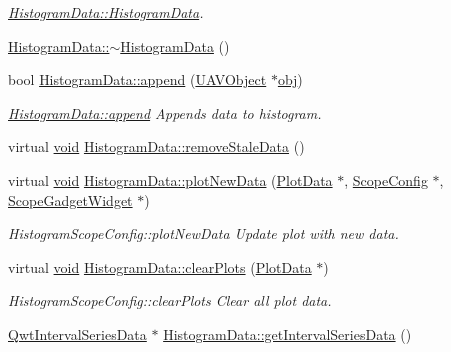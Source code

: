 \begin{DoxyCompactItemize}
\begin{DoxyCompactList}\small\item\em \hyperlink{group___scope_plugin_ga72e50dd5614c61d39ec10aa120c47d3b}{Histogram\-Data\-::\-Histogram\-Data}. \end{DoxyCompactList}\item 
\hyperlink{group___scope_plugin_ga4469655db4ea251dc664d6537ac56c5a}{Histogram\-Data\-::$\sim$\-Histogram\-Data} ()
\item 
bool \hyperlink{group___scope_plugin_ga0d810ba48c487ee265cdc1386b23bece}{Histogram\-Data\-::append} (\hyperlink{class_u_a_v_object}{U\-A\-V\-Object} $\ast$\hyperlink{glext_8h_a0c0d4701a6c89f4f7f0640715d27ab26}{obj})
\begin{DoxyCompactList}\small\item\em \hyperlink{group___scope_plugin_ga0d810ba48c487ee265cdc1386b23bece}{Histogram\-Data\-::append} Appends data to histogram. \end{DoxyCompactList}\item 
virtual \hyperlink{group___u_a_v_objects_plugin_ga444cf2ff3f0ecbe028adce838d373f5c}{void} \hyperlink{group___scope_plugin_ga347aa15de12fde18bb0b88245ef0ff57}{Histogram\-Data\-::remove\-Stale\-Data} ()
\item 
virtual \hyperlink{group___u_a_v_objects_plugin_ga444cf2ff3f0ecbe028adce838d373f5c}{void} \hyperlink{group___scope_plugin_gac17c425a9e59f0b1187d76a8cc13e6ad}{Histogram\-Data\-::plot\-New\-Data} (\hyperlink{class_plot_data}{Plot\-Data} $\ast$, \hyperlink{class_scope_config}{Scope\-Config} $\ast$, \hyperlink{class_scope_gadget_widget}{Scope\-Gadget\-Widget} $\ast$)
\begin{DoxyCompactList}\small\item\em Histogram\-Scope\-Config\-::plot\-New\-Data Update plot with new data. \end{DoxyCompactList}\item 
virtual \hyperlink{group___u_a_v_objects_plugin_ga444cf2ff3f0ecbe028adce838d373f5c}{void} \hyperlink{group___scope_plugin_gaba86940fa8881f8a36b2bafacd9d59f6}{Histogram\-Data\-::clear\-Plots} (\hyperlink{class_plot_data}{Plot\-Data} $\ast$)
\begin{DoxyCompactList}\small\item\em Histogram\-Scope\-Config\-::clear\-Plots Clear all plot data. \end{DoxyCompactList}\item 
\hyperlink{class_qwt_interval_series_data}{Qwt\-Interval\-Series\-Data} $\ast$ \hyperlink{group___scope_plugin_ga025ada984f64906121e98805e9ab43b4}{Histogram\-Data\-::get\-Interval\-Series\-Data} ()

\end{DoxyCompactItemize}
